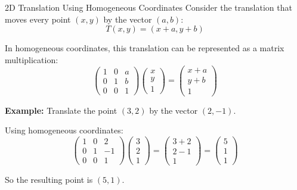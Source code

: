 \documentclass[12pt,a4paper]{article}
\begin{document}
	\begin{example}{2D Translation Using Homogeneous Coordinates}
		Consider the translation that moves every point $(x, y)$ by the vector $(a, b)$:
		\[
		T(x, y) = (x + a, y + b)
		\]
		
		In homogeneous coordinates, this translation can be represented as a matrix multiplication:
		\[
		\begin{pmatrix} 1 & 0 & a \\ 0 & 1 & b \\ 0 & 0 & 1 \end{pmatrix} \begin{pmatrix} x \\ y \\ 1 \end{pmatrix} = \begin{pmatrix} x + a \\ y + b \\ 1 \end{pmatrix}
		\]
		
		\textbf{Example:} Translate the point $(3, 2)$ by the vector $(2, -1)$.
		
		Using homogeneous coordinates:
		\[
		\begin{pmatrix} 1 & 0 & 2 \\ 0 & 1 & -1 \\ 0 & 0 & 1 \end{pmatrix} \begin{pmatrix} 3 \\ 2 \\ 1 \end{pmatrix} = \begin{pmatrix} 3 + 2 \\ 2 - 1 \\ 1 \end{pmatrix} = \begin{pmatrix} 5 \\ 1 \\ 1 \end{pmatrix}
		\]
		
		So the resulting point is $(5, 1)$.
	\end{example}
	
\end{document}
